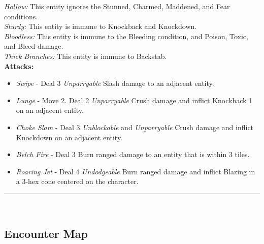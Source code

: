 \emph{Hollow:} This entity ignores the Stunned, Charmed, Maddened, and Fear conditions.\\

\emph{Sturdy:} This entity is immune to Knockback and Knockdown.\\

\emph{Bloodless:} This entity is immune to the Bleeding condition, and Poison, Toxic, and Bleed damage.\\

\emph{Thick Branches:} This entity is immune to Backstab.\\

\textbf{Attacks:}
\begin{itemize}
\item \emph{Swipe} - Deal 3 \emph{Unparryable} Slash damage to an adjacent entity.
\item \emph{Lunge} - Move 2. Deal 2 \emph{Unparryable} Crush damage and inflict Knockback 1 on an adjacent entity.
\item \emph{Choke Slam} - Deal 3 \emph{Unblockable} and \emph{Unparryable} Crush damage and inflict Knockdown on an adjacent entity.
\item \emph{Belch Fire} - Deal 3 Burn ranged damage to an entity that is within 3 tiles.
\item \emph{Roaring Jet} - Deal 4 \emph{Undodgeable} Burn ranged damage and inflict Blazing in a 3-hex cone centered on the character.
\end{itemize}
\hrule
\ \\

\pagebreak

\subsection*{Encounter Map}
\begin{center}
\end{center}

